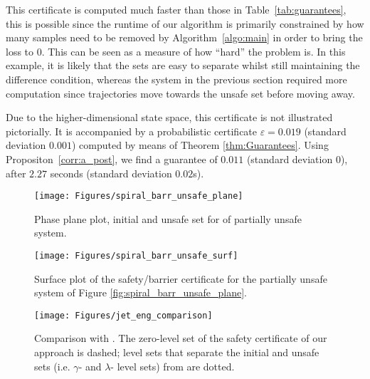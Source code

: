 This certificate is computed much faster than those in Table~\ref{tab:guarantees}, this is possible since the runtime of our algorithm is primarily constrained by how many samples need to be removed by Algorithm~\ref{algo:main} in order to bring the loss to $0$.
This can be seen as a measure of how ``hard'' the problem is.
In this example, it is likely that the sets are easy to separate whilst still maintaining the difference condition, whereas the system in the previous section required more computation since trajectories move towards the unsafe set before moving away.

Due to the higher-dimensional state space, this certificate is not illustrated pictorially. 
It is accompanied by a probabilistic certificate $\varepsilon = 0.019$ (standard deviation $0.001$) computed by means of Theorem \ref{thm:Guarantees}.
Using Propositon~\ref{corr:a_post}, we find a guarantee of $0.011$ (standard deviation $0$), after $2.27$ seconds (standard deviation $0.02$s).


 \begin{figure*}[t]
 	\begin{minipage}[t]{0.3\linewidth}
	   \texttt{[image: Figures/spiral\_barr\_unsafe\_plane]}
	   \caption{Phase plane plot, initial and unsafe set for of partially unsafe system.}
	   \label{fig:spiral_barr_unsafe_plane} 
    \end{minipage}\hfill
 	\begin{minipage}[t]{0.3\linewidth}
	   \texttt{[image: Figures/spiral\_barr\_unsafe\_surf]}
	   \caption{Surface plot of the safety/barrier certificate for the partially unsafe system of Figure \ref{fig:spiral_barr_unsafe_plane}.}
	   \label{fig:spiral_barr_unsafe_surf}
    \end{minipage}\hfill
    \begin{minipage}[t]{0.3\linewidth}
        	\texttt{[image: Figures/jet\_eng\_comparison]}
	\caption{Comparison with \cite{DBLP:journals/tac/NejatiLJSZ23}. The zero-level set of the safety certificate of our approach is dashed; level sets that separate the initial and unsafe sets (i.e. $\gamma$- and $\lambda$- level sets) from \cite{DBLP:journals/tac/NejatiLJSZ23} are dotted.}
	\label{fig:jet_eng_comparison}
    \end{minipage}
 \end{figure*}
 
